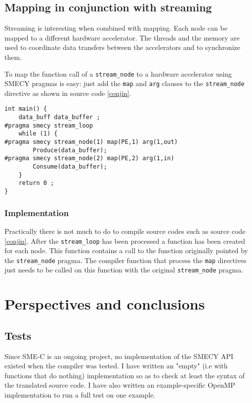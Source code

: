 \documentclass[a4paper]{article}
\begin{document}
	
	\subsection{Mapping in conjunction with streaming}
	Streaming is interesting when combined with mapping. Each node can be mapped to a different hardware accelerator. The threads and the memory are used to coordinate data transfers between the accelerators and to synchronize them.
	
	To map the function call of a \verb+stream_node+ to a hardware accelerator using SMECY pragmas is easy: just add the \verb+map+ and \verb+arg+ clauses to the \verb+stream_node+ directive as shown in source code \ref{conjin}.
		
	\begin{lstlisting}[label=conjin,caption={Input code with streaming and
mapping pragmas. The definitions of \texttt{Produce} and \texttt{Consume} functions are not shown.}]
int main() {
	data_buff data_buffer ;
#pragma smecy stream_loop
	while (1) {
#pragma smecy stream_node(1) map(PE,1) arg(1,out)
		Produce(data_buffer);
#pragma smecy stream_node(2) map(PE,2) arg(1,in)
		Consume(data_buffer);
	}
	return 0 ;
}
	\end{lstlisting}
	
	\subsubsection{Implementation}

 Practically there is not much to do to compile source codes such as source code \ref{conjin}. After the \verb+stream_loop+ has been processed a function has been created for each node. This function contains a call to the function originally pointed by the \verb+stream_node+ pragma. The compiler function that process the \verb+map+ directives just needs to be called on this function with the original \verb+stream_node+ pragma.

\section{Perspectives and conclusions}
	\subsection{Tests}
	Since SME-C is an ongoing project, no implementation of the SMECY API existed when the compiler was tested. I have written an "empty" (i.e with functions that do nothing) implementation so as to check at least the syntax of the translated source code. I have also written an example-specific OpenMP implementation to run a full test on one example.
	
\end{document}
